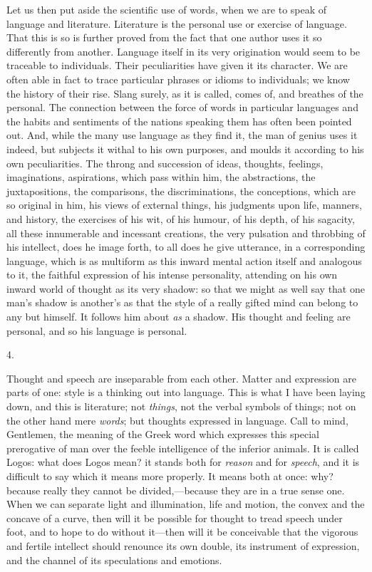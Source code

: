 Let us then put aside the scientific use of words, when we are to
speak of language and literature. Literature is the personal use or
exercise of language. That this is so is further proved from the fact
that one author uses it so differently from another. Language itself
in its very origination would seem to be traceable to individuals.
Their peculiarities have given it its character. We are often able in
fact to trace particular phrases or idioms to individuals; we know the
history of their rise. Slang surely, as it is called, comes of, and
breathes of the personal. The connection between the force of words in
particular languages and the habits and sentiments of the
nations speaking them has often been pointed out. And, while the many
use language as they find it, the man of genius uses it indeed, but
subjects it withal to his own purposes, and moulds it according to his
own peculiarities. The throng and succession of ideas, thoughts,
feelings, imaginations, aspirations, which pass within him, the
abstractions, the juxtapositions, the comparisons, the
discriminations, the conceptions, which are so original in him, his
views of external things, his judgments upon life, manners, and
history, the exercises of his wit, of his humour, of his depth, of his
sagacity, all these innumerable and incessant creations, the very
pulsation and throbbing of his intellect, does he image forth, to all
does he give utterance, in a corresponding language, which is as
multiform as this inward mental action itself and analogous to it, the
faithful expression of his intense personality, attending on his own
inward world of thought as its very shadow: so that we might as well
say that one man's shadow is another's as that the style of a really
gifted mind can belong to any but himself. It follows him about \emph{as}
a shadow. His thought and feeling are personal, and so his language is
personal.

4.

Thought and speech are inseparable from each other. Matter and
expression are parts of one: style is a thinking out into language.
This is what I have been laying down, and this is literature; not \emph{things},
not the verbal symbols of things; not on the other hand mere \emph{words};
but thoughts expressed in language. Call to mind, Gentlemen, the
meaning of the Greek word which expresses this special prerogative of
man over the feeble intelligence of the inferior animals. It is called
Logos: what does Logos mean? it stands both for \emph{reason} and for
\emph{speech}, and it is difficult to say which it means more
properly. It means both at once: why? because really they cannot be
divided,—because they are in a true sense one. When we can separate
light and illumination, life and motion, the convex and the concave of
a curve, then will it be possible for thought to tread speech under
foot, and to hope to do without it—then will it be conceivable that
the vigorous and fertile intellect should renounce its own double, its
instrument of expression, and the channel of its speculations and
emotions.

